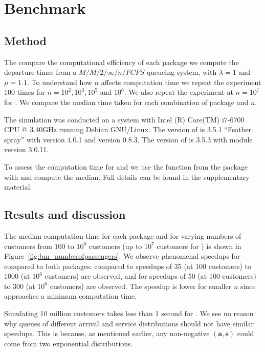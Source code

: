 \documentclass[article]{jss}
\begin{document}
\section{Benchmark} \label{sec:Benchmark}

\subsection{Method}

The compare the computational efficiency of each package we compute
the departure times from a $M/M/2/\infty/n/\mathit{FCFS}$ queueing
system, with $\lambda = 1$ and $\mu = 1.\dot{1}$. To understand how
$n$ affects computation time we repeat the experiment 100 times for
$n = 10^2, 10^3, 10^5$ and $10^6 $. We also repeat the experiment at
$n = 10^7$ for . We compare the median time taken
for each combination of package and $n$.

The simulation was conducted on a system with Intel (R) Core(TM) i7-6700 CPU @ 3.40GHz running Debian GNU/Linux. The version of  is 3.5.1 ``Feather spray'' with  version 4.0.1 and  version 0.8.3. The version of  is 3.5.3 with  module version 3.0.11.

To assess the computation time for  and  we use the  function from the  package \citep{Rpkg_microbenchmark} with  and compute the median. Full details can be found in the supplementary material. 

\subsection{Results and discussion}

The median computation time for each package and for varying numbers of customers from $100$ to $10^6$ customers (up to $10^7$ customers for ) is shown in Figure~\ref{fig:bm_numberofpassengers}. We observe phenomenal speedups for  compared to both packages: compared to  speedups of 35 (at 100 customers) to 1000 (at $10^6$ customers) are observed, and for  speedups of 50 (at 100 customers) to 300 (at $10^6$ customers) are observed. The speedup is lower for smaller $n$ since  approaches a minimum computation time. 

Simulating 10 million customers takes less than 1 second for . We see no reason why queues of different arrival and service distributions should not have similar speedups. This is because, as mentioned earlier, any non-negative $\mathbf{(a,s)}$ could come from two exponential distributions. 
\end{document}

